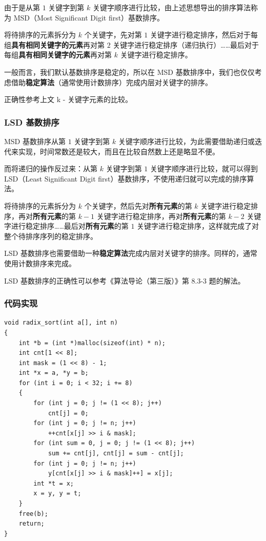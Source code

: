 \documentclass[12pt]{article}
\begin{document}
由于是从第 $1$ 关键字到第 $k$ 关键字顺序进行比较，由上述思想导出的排序算法称为 MSD（Most Significant Digit first）基数排序。

将待排序的元素拆分为 $k$ 个关键字，先对第 $1$ 关键字进行稳定排序，然后对于每组\textbf{具有相同关键字的元素}再对第 $2$ 关键字进行稳定排序（递归执行）……最后对于每组\textbf{具有相同关键字的元素}再对第 $k$ 关键字进行稳定排序。

一般而言，我们默认基数排序是稳定的，所以在 MSD 基数排序中，我们也仅仅考虑借助\textbf{稳定算法}（通常使用计数排序）完成内层对关键字的排序。

正确性参考上文 k - 关键字元素的比较。

\subsubsection{LSD 基数排序}

MSD 基数排序从第 $1$ 关键字到第 $k$ 关键字顺序进行比较，为此需要借助递归或迭代来实现，时间常数还是较大，而且在比较自然数上还是略显不便。

而将递归的操作反过来：从第 $k$ 关键字到第 $1$ 关键字顺序进行比较，就可以得到 LSD（Least Significant Digit first）基数排序，不使用递归就可以完成的排序算法。


将待排序的元素拆分为 $k$ 个关键字，然后先对\textbf{所有元素}的第 $k$ 关键字进行稳定排序，再对\textbf{所有元素}的第 $k-1$ 关键字进行稳定排序，再对\textbf{所有元素}的第 $k-2$ 关键字进行稳定排序……最后对\textbf{所有元素}的第 $1$ 关键字进行稳定排序，这样就完成了对整个待排序序列的稳定排序。

LSD 基数排序也需要借助一种\textbf{稳定算法}完成内层对关键字的排序。同样的，通常使用计数排序来完成。

LSD 基数排序的正确性可以参考《算法导论（第三版）》第 8.3-3 题的解法。

\subsubsection{代码实现}

{\setmainfont{Consolas} %
\begin{lstlisting}
void radix_sort(int a[], int n)
{
    int *b = (int *)malloc(sizeof(int) * n);
    int cnt[1 << 8];
    int mask = (1 << 8) - 1;
    int *x = a, *y = b;
    for (int i = 0; i < 32; i += 8)
    {
        for (int j = 0; j != (1 << 8); j++)
            cnt[j] = 0;
        for (int j = 0; j != n; j++)
            ++cnt[x[j] >> i & mask];
        for (int sum = 0, j = 0; j != (1 << 8); j++)
            sum += cnt[j], cnt[j] = sum - cnt[j];
        for (int j = 0; j != n; j++)
            y[cnt[x[j] >> i & mask]++] = x[j];
        int *t = x;
        x = y, y = t;
    }
    free(b);
    return;
}
\end{lstlisting}
}
\end{document}
